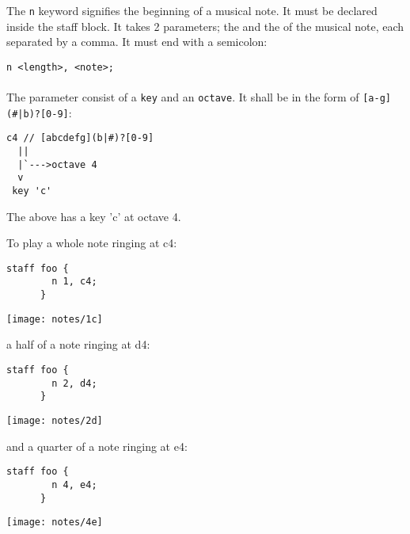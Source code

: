 \subsubsection{}

\np The \verb+n+ keyword signifies the beginning of a musical note. It must be declared
inside the staff block.
It takes 2 parameters; the  and the  of the
musical note, each separated by a comma. It must end with a semicolon: 

\begin{Verbatim}[frame=single]
      n <length>, <note>;
\end{Verbatim}

\paragraph{} The parameter  consist of a \verb+key+ and an \verb+octave+. It shall be in the form of \verb+[a-g](#|b)?[0-9]+:

\begin{Verbatim}[frame=single]
  c4 // [abcdefg](b|#)?[0-9]
  ||
  |`--->octave 4
  v
 key 'c'
\end{Verbatim}
The above has a key 'c' at octave 4.

\np To play a whole note ringing at c4:
\begin{Verbatim}[frame=single]
      staff foo {
        n 1, c4;
      }
\end{Verbatim}

\begin{center}
\texttt{[image: notes/1c]}
\end{center}

a half of a note ringing at d4:

\begin{Verbatim}[frame=single]
      staff foo {
        n 2, d4;
      }
\end{Verbatim}

\begin{center}
\texttt{[image: notes/2d]}
\end{center}

and a quarter of a note ringing at e4:
\begin{Verbatim}[frame=single]
      staff foo {
        n 4, e4;
      }
\end{Verbatim}

\begin{center}
\texttt{[image: notes/4e]}
\end{center}

